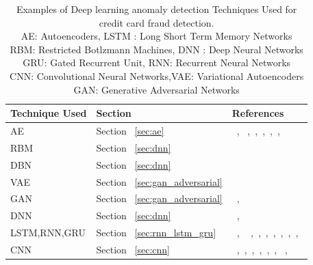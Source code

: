 \begin{table}
\begin{center}
  \caption{Examples of Deep learning anomaly detection Techniques Used for credit card fraud detection.
          \\AE: Autoencoders, LSTM : Long Short Term Memory Networks
          \\RBM: Restricted Botlzmann Machines, DNN : Deep Neural Networks
          \\GRU: Gated Recurrent Unit, RNN: Recurrent Neural Networks
          \\CNN: Convolutional Neural Networks,VAE: Variational Autoencoders
          \\GAN: Generative Adversarial Networks}
  \label{tab:creditfraudDetect}
    \begin{tabular}{ | l | p{2cm} | p{7cm} |}
    \hline
    Technique Used & Section & References \\ \hline
     AE  & Section ~\ref{sec:ae}  & ~\cite{schreyer2017detection},~\cite{wedge2017solving} ,~\cite{paula2016deep},~\cite{renstrom2018fraud},~\cite{kazemi2017using},~\cite{zheng2018one},~\cite{pumsirirat2018credit} \\\hline
     RBM  & Section ~\ref{sec:dnn}  & ~\cite{pumsirirat2018credit} \\\hline
     DBN & Section ~\ref{sec:dnn} & ~\cite{seeja2014fraudminer} \\\hline
     VAE & Section ~\ref{sec:gan_adversarial} & ~\cite{sweers2018autoencoding} \\\hline
     GAN & Section ~\ref{sec:gan_adversarial} & ~\cite{fiore2017using},~\cite{choi2018generative} \\\hline
     DNN  & Section ~\ref{sec:dnn} & ~\cite{dorronsoro1997neural}, ~\cite{gomez2018end} \\\hline
     LSTM,RNN,GRU  & Section ~\ref{sec:rnn_lstm_gru} & ~\cite{wiese2009credit}, ~\cite{jurgovsky2018sequence} ,~\cite{heryadi2017learning},~\cite{ando2016detecting},~\cite{wang2017session},~\cite{alowais2012credit},~\cite{amarasinghe2018critical},~\cite{abroyan2017neural},~\cite{lp2018transaction}\\\hline
     CNN  & Section ~\ref{sec:cnn} & ~\cite{shen2007application},~\cite{chouiekh2018convnets},~\cite{abroyan2017convolutional},~\cite{fu2016credit},~\cite{lu2017deep},~\cite{wang2018credit},~\cite{abroyan2017neural} ,~\cite{zhang2018model}\\\hline
    \end{tabular}
\end{center}
\end{table}




